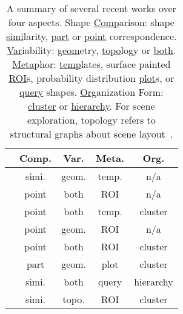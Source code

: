 \begin{table}[!t]
\centering
\begin{tabular}{l||c|c|c|c} \hline
                                         & \textbf{Comp.} & \textbf{Var.}  & \textbf{Meta.}  & \textbf{Org.}
 \\ \hline   \cite{Ovsjanikov:2011:ECV}  & simi. & geom. & temp.  & n/a
 \\ \hline   \cite{Kim:2012:FC}          & point & both  & ROI    & n/a
 \\ \hline   \cite{Kim:2013:LPT}         & point & both  & temp.  & cluster
 \\ \hline   \cite{Rustamov:2013:SD}     & point & geom. & ROI    & n/a
 \\ \hline   \cite{Huang:2014:FMN}       & point & both  & ROI    & cluster
 \\ \hline   \cite{Fish:2014:MR}         & part  & geom. & plot    & cluster
 \\ \hline   \cite{Huang:2013:QOC}       & simi. & both  & query  & hierarchy
 \\ \hline   \cite{Xu:2014:OHSC}         & simi. & topo. & ROI    & cluster
 \\ \hline
\end{tabular}
\caption{A summary of several recent works over four aspects.
         Shape \underline{Comp}arison: shape \underline{simi}larity, \underline{part} or \underline{point} correspondence.
         \underline{Var}iability: \underline{geom}etry, \underline{topo}logy or \underline{both}.
         \underline{Meta}phor: \underline{temp}lates, surface painted \underline{ROI}s,
         probability distribution \underline{plot}s, or \underline{query} shapes.
         \underline{Org}anization Form: \underline{cluster} or \underline{hierarchy}.
         For scene exploration, topology refers to structural graphs about scene layout~\cite{Xu:2014:OHSC}.}
\label{tab:exploration}
\end{table}


